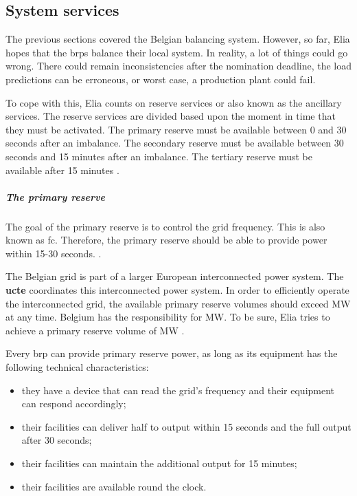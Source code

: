 \subsection{System services}
\label{s:reservepower}

The previous sections covered the Belgian balancing system. However, so far, Elia hopes that the \glspl{brp} balance their local system. In reality, a lot of things could go wrong. There could remain inconsistencies after the nomination deadline, the load predictions can be erroneous, or worst case, a production plant could fail. 

To cope with this, Elia counts on reserve services or also known as the ancillary services. The reserve services are divided based upon the moment in time that they must be activated. The primary reserve must be available between 0 and 30 seconds after an imbalance. The secondary reserve must be available between 30 seconds and 15 minutes after an imbalance. The tertiary reserve must be available after 15 minutes \cite{EliaRO}.

\subparagraph{The primary reserve}

The goal of the primary reserve is to control the grid frequency. This is also known as \gls{fc}. Therefore, the primary reserve should be able to provide power within 15-30 seconds. \cite{EliaRP}.

The Belgian grid is part of a larger European interconnected power system. The \textbf{\gls{ucte}} coordinates this interconnected power system. In order to efficiently operate the interconnected grid, the available primary reserve volumes should exceed \unit[3000]{MW} at any time. Belgium has the responsibility for \unit[100]{MW}. To be sure, Elia tries to achieve a primary reserve volume of \unit[140]{MW} \cite{EliaRP}.

Every \gls{brp} can provide primary reserve power, as long as its equipment has the following technical characteristics:
\begin{itemize}
\item they have a device that can read the grid's frequency and their equipment can respond accordingly;
\item their facilities can deliver half to output within 15 seconds and the full output after 30 seconds;
\item their facilities can maintain the additional output for 15 minutes;
\item their facilities are available round the clock.
\end{itemize}

